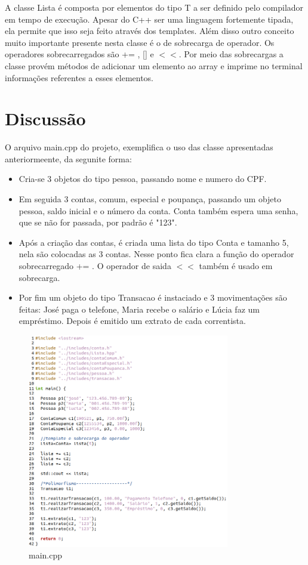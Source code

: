 \documentclass[conference]{IEEEtran}
\begin{document}
A classe Lista é composta por elementos do tipo T a ser definido pelo compilador em tempo de execução. Apesar do C++ ser uma linguagem fortemente tipada, ela permite que isso seja feito através dos templates. Além disso outro conceito muito importante presente nesta classe é o de sobrecarga de operador. Os operadores sobrecarregados são += , [] e $ << $. Por meio das sobrecargas a classe provém métodos de adicionar um elemento ao array e imprime no terminal informações referentes a esses elementos.


\section{Discussão}
O arquivo main.cpp do projeto, exemplifica o uso das classe apresentadas anteriormeente, da segunite forma:
\begin{itemize}
    \item Cria-se 3 objetos do tipo pessoa, passando nome e numero do CPF.
    \item Em seguida 3 contas, comum, especial e poupança, passando um objeto pessoa, saldo inicial e o número da conta. Conta também espera uma senha, que se não for passada, por padrão é "123".
    \item Após a criação das contas, é criada uma lista do tipo Conta e tamanho 5, nela são colocadas as 3 contas. Nesse ponto fica clara a função do operador sobrecarregado += . O operador de saida $<<$ também é usado em sobrecarga.
    \item Por fim um objeto do tipo Transacao é instaciado e 3 movimentações são feitas: José paga o telefone, Maria recebe o salário e Lúcia faz um empréstimo. Depois é emitido um extrato de cada correntista.
    \end{itemize}
    \begin{figure}[htbp]
        \centering
        \includegraphics[width=8.8cm]{../img/main.png}
        \caption{main.cpp}
        \label{fig_main}
    \end{figure}
\end{document}
